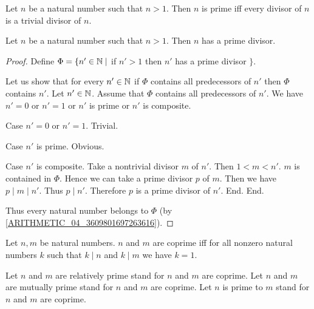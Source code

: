 \documentclass[10pt]{article}
\begin{document}
  \begin{forthel}
    \begin{proposition}
      Let $n$ be a natural number such that $n > 1$.
      Then $n$ is prime iff every divisor of $n$ is a trivial divisor of $n$.
    \end{proposition}
  \end{forthel}

  \begin{forthel}
    \begin{proposition}
      Let $n$ be a natural number such that $n > 1$.
      Then $n$ has a prime divisor.
    \end{proposition}
    \begin{proof}
      Define $\Phi = \{ n' \in \mathbb{N} \mid$ if $n' > 1$ then $n'$ has a prime divisor $\}$.

      Let us show that for every $n' \in \mathbb{N}$ if $\Phi$ contains all
      predecessors of $n'$ then $\Phi$ contains $n'$.
        Let $n' \in \mathbb{N}$.
        Assume that $\Phi$ contains all predecessors of $n'$.
        We have $n' = 0$ or $n' = 1$ or $n'$ is prime or $n'$ is composite.

        Case $n' = 0$ or $n' = 1$. Trivial.

        Case $n'$ is prime. Obvious.

        Case $n'$ is composite.
          Take a nontrivial divisor $m$ of $n'$.
          Then $1 < m < n'$.
          $m$ is contained in $\Phi$.
          Hence we can take a prime divisor $p$ of $m$.
          Then we have $p \mid m \mid n'$.
          Thus $p \mid n'$.
          Therefore $p$ is a prime divisor of $n'$.
        End.
      End.

      Thus every natural number belongs to $\Phi$ (by \cref{ARITHMETIC_04_3609801697263616}).
    \end{proof}
  \end{forthel}

  \begin{forthel}
    \begin{definition}
      Let $n, m$ be natural numbers.
      $n$ and $m$ are coprime iff for all nonzero natural numbers $k$ such that
      $k \mid n$ and $k \mid m$ we have $k = 1$.
    \end{definition}

    Let $n$ and $m$ are relatively prime stand for $n$ and $m$ are coprime.
    Let $n$ and $m$ are mutually prime stand for $n$ and $m$ are coprime.
    Let $n$ is prime to $m$ stand for $n$ and $m$ are coprime.
  \end{forthel}
\end{document}
